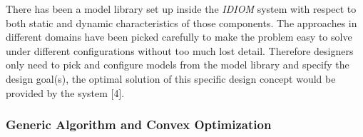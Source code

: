 There has been a model library set up inside the \textit{IDIOM} system with respect to both static and dynamic characteristics of those components. The approaches in different domains have been picked carefully to make the problem easy to solve under different configurations without too much lost detail. Therefore designers only need to pick and configure models from the model library and specify the design goal(s), the optimal solution of this specific design concept would be provided by the system [4]. 

\subsubsection{Generic Algorithm and Convex Optimization}

